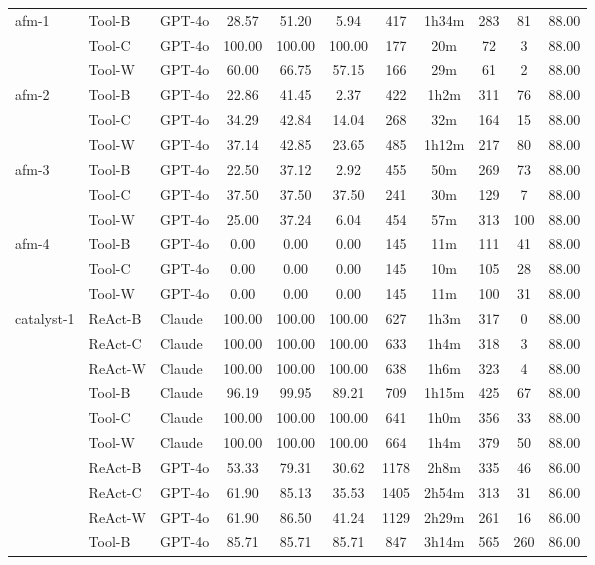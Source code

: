 \begin{longtable}{lllcccccccc}
afm-1 & Tool-B & GPT-4o & 28.57 & 51.20 & 5.94 & 417 & 1h34m & 283 & 81 & 88.00 \\
 & Tool-C & GPT-4o & 100.00 & 100.00 & 100.00 & 177 & 20m & 72 & 3 & 88.00 \\
 & Tool-W & GPT-4o & 60.00 & 66.75 & 57.15 & 166 & 29m & 61 & 2 & 88.00 \\
afm-2 & Tool-B & GPT-4o & 22.86 & 41.45 & 2.37 & 422 & 1h2m & 311 & 76 & 88.00 \\
 & Tool-C & GPT-4o & 34.29 & 42.84 & 14.04 & 268 & 32m & 164 & 15 & 88.00 \\
 & Tool-W & GPT-4o & 37.14 & 42.85 & 23.65 & 485 & 1h12m & 217 & 80 & 88.00 \\
afm-3 & Tool-B & GPT-4o & 22.50 & 37.12 & 2.92 & 455 & 50m & 269 & 73 & 88.00 \\
 & Tool-C & GPT-4o & 37.50 & 37.50 & 37.50 & 241 & 30m & 129 & 7 & 88.00 \\
 & Tool-W & GPT-4o & 25.00 & 37.24 & 6.04 & 454 & 57m & 313 & 100 & 88.00 \\
afm-4 & Tool-B & GPT-4o & 0.00 & 0.00 & 0.00 & 145 & 11m & 111 & 41 & 88.00 \\
 & Tool-C & GPT-4o & 0.00 & 0.00 & 0.00 & 145 & 10m & 105 & 28 & 88.00 \\
 & Tool-W & GPT-4o & 0.00 & 0.00 & 0.00 & 145 & 11m & 100 & 31 & 88.00 \\
catalyst-1 & ReAct-B & Claude & 100.00 & 100.00 & 100.00 & 627 & 1h3m & 317 & 0 & 88.00 \\
 & ReAct-C & Claude & 100.00 & 100.00 & 100.00 & 633 & 1h4m & 318 & 3 & 88.00 \\
 & ReAct-W & Claude & 100.00 & 100.00 & 100.00 & 638 & 1h6m & 323 & 4 & 88.00 \\
 & Tool-B & Claude & 96.19 & 99.95 & 89.21 & 709 & 1h15m & 425 & 67 & 88.00 \\
 & Tool-C & Claude & 100.00 & 100.00 & 100.00 & 641 & 1h0m & 356 & 33 & 88.00 \\
 & Tool-W & Claude & 100.00 & 100.00 & 100.00 & 664 & 1h4m & 379 & 50 & 88.00 \\
 & ReAct-B & GPT-4o & 53.33 & 79.31 & 30.62 & 1178 & 2h8m & 335 & 46 & 86.00 \\
 & ReAct-C & GPT-4o & 61.90 & 85.13 & 35.53 & 1405 & 2h54m & 313 & 31 & 86.00 \\
 & ReAct-W & GPT-4o & 61.90 & 86.50 & 41.24 & 1129 & 2h29m & 261 & 16 & 86.00 \\
 & Tool-B & GPT-4o & 85.71 & 85.71 & 85.71 & 847 & 3h14m & 565 & 260 & 86.00 \\

\end{longtable}
